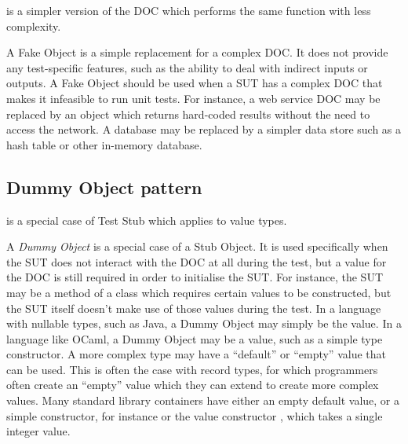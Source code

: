  is a simpler version of the DOC which
performs the same function with less complexity.

A Fake Object is a simple replacement for a complex DOC. It does not
provide any test-specific features, such as the ability to deal with
indirect inputs or outputs. A Fake Object should be used when a SUT
has a complex DOC that makes it infeasible to run unit tests. For
instance, a web service DOC may be replaced by an object which returns
hard-coded results without the need to access the network. A database
may be replaced by a simpler data store such as a hash table or other
in-memory database.


\subsection{Dummy Object pattern}
\label{testdoubles:dummy}

 is a special case of Test Stub which applies
to value types.

A \textit{Dummy Object} is a special case of a Stub Object. It is used
specifically when the SUT does not interact with the DOC at all during
the test, but a value for the DOC is still required in order to
initialise the SUT. For instance, the SUT may be a method of a class
which requires certain values to be constructed, but the SUT itself
doesn't make use of those values during the test. In a language with
nullable types, such as Java, a Dummy Object may simply be the
 value. In a language like OCaml, a Dummy Object may be a
value, such as a simple type constructor. A more complex type may have
a ``default'' or ``empty'' value that can be used. This is often the
case with record types, for which programmers often create an
``empty'' value which they can extend to create more complex
values. Many standard library containers have either an empty default
value, or a simple constructor, for instance  or the
value constructor , which takes a single integer
value.


